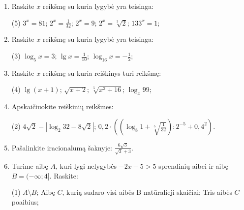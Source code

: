 \documentclass[a4paper]{article}
\begin{document}
\begin{enumerate}
      \item Raskite $x$ reikšmę su kuria lygybė yra teisinga:

            \begin{tasks}[item-format={\normalfont}, after-item-skip=4mm](5)
                  \task $3^{x}=81$;
                  \task $2^{x}=\frac{1}{32}$;
                  \task $2^{x}=9$;
                  \task $2^{x}=\sqrt[3]{2}$;
                  \task $133^{x}=1$;
            \end{tasks}

      \item Raskite $x$  reikšmę su kuria lygybė yra teisinga:
            \begin{tasks}[item-format={\normalfont}, after-item-skip=4mm](3)
                  \task $\log_{5} x=3$;
                  \task $\lg x=\frac{1}{10}$;
                  \task $\log_{16} x=-\frac{1}{2}$;
            \end{tasks}

      \item Raskite $x$  reikšmę su kuria reiškinys turi reikšmę:
            \begin{tasks}[item-format={\normalfont}, after-item-skip=4mm](4)
                  \task $\lg (x+1)$;
                  \task $\sqrt{x+2}$;
                  \task $\sqrt[5]{x^{2}+16}$;
                  \task $\log_{x}99$;
            \end{tasks}

      \item Apskaičiuokite reiškinių reikšmes:
            \begin{tasks}[item-format={\normalfont}, after-item-skip=10mm](2)
                  \task $4\sqrt{2}-\left|\log_{2}32-8\sqrt{2}\right|$;
                  \task $0,2 \cdot
                        ((\log_{8}1+\sqrt[5]{\frac{1}{32}}):2^{-5}+0,4^2)$.
            \end{tasks}
      \item Pašalinkite iracionalumą šaknyje: $\frac{6\sqrt{3}}{\sqrt{3}+3}$.
      \item Turime aibę $A$, kuri lygi nelygybės $-2x-5>5$ sprendinių aibei ir
            aibę $B=(-\infty;4]$. Raskite:
            \begin{tasks}[item-format={\normalfont}, after-item-skip=2mm](1)
                  \task $A \setminus B$;
                  \task Aibę $C$, kurią sudaro visi aibės B natūralieji skaičiai;
                  \task Tris aibės $C$ poaibius;
            \end{tasks}

\end{enumerate}
\end{document}
